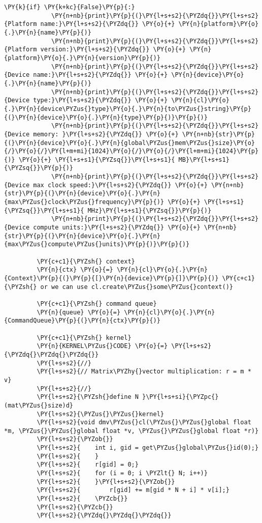 \begin{Verbatim}[commandchars=\\\{\}]
         \PY{k}{if} \PY{k+kc}{False}\PY{p}{:}
             \PY{n+nb}{print}\PY{p}{(}\PY{l+s+s2}{\PYZdq{}}\PY{l+s+s2}{Platform name:}\PY{l+s+s2}{\PYZdq{}} \PY{o}{+} \PY{n}{platform}\PY{o}{.}\PY{n}{name}\PY{p}{)}
             \PY{n+nb}{print}\PY{p}{(}\PY{l+s+s2}{\PYZdq{}}\PY{l+s+s2}{Platform version:}\PY{l+s+s2}{\PYZdq{}} \PY{o}{+} \PY{n}{platform}\PY{o}{.}\PY{n}{version}\PY{p}{)}
             \PY{n+nb}{print}\PY{p}{(}\PY{l+s+s2}{\PYZdq{}}\PY{l+s+s2}{Device name:}\PY{l+s+s2}{\PYZdq{}} \PY{o}{+} \PY{n}{device}\PY{o}{.}\PY{n}{name}\PY{p}{)}
             \PY{n+nb}{print}\PY{p}{(}\PY{l+s+s2}{\PYZdq{}}\PY{l+s+s2}{Device type:}\PY{l+s+s2}{\PYZdq{}} \PY{o}{+} \PY{n}{cl}\PY{o}{.}\PY{n}{device\PYZus{}type}\PY{o}{.}\PY{n}{to\PYZus{}string}\PY{p}{(}\PY{n}{device}\PY{o}{.}\PY{n}{type}\PY{p}{)}\PY{p}{)}
             \PY{n+nb}{print}\PY{p}{(}\PY{l+s+s2}{\PYZdq{}}\PY{l+s+s2}{Device memory: }\PY{l+s+s2}{\PYZdq{}} \PY{o}{+} \PY{n+nb}{str}\PY{p}{(}\PY{n}{device}\PY{o}{.}\PY{n}{global\PYZus{}mem\PYZus{}size}\PY{o}{/}\PY{o}{/}\PY{l+m+mi}{1024}\PY{o}{/}\PY{o}{/}\PY{l+m+mi}{1024}\PY{p}{)} \PY{o}{+} \PY{l+s+s1}{\PYZsq{}}\PY{l+s+s1}{ MB}\PY{l+s+s1}{\PYZsq{}}\PY{p}{)}
             \PY{n+nb}{print}\PY{p}{(}\PY{l+s+s2}{\PYZdq{}}\PY{l+s+s2}{Device max clock speed:}\PY{l+s+s2}{\PYZdq{}} \PY{o}{+} \PY{n+nb}{str}\PY{p}{(}\PY{n}{device}\PY{o}{.}\PY{n}{max\PYZus{}clock\PYZus{}frequency}\PY{p}{)} \PY{o}{+} \PY{l+s+s1}{\PYZsq{}}\PY{l+s+s1}{ MHz}\PY{l+s+s1}{\PYZsq{}}\PY{p}{)}
             \PY{n+nb}{print}\PY{p}{(}\PY{l+s+s2}{\PYZdq{}}\PY{l+s+s2}{Device compute units:}\PY{l+s+s2}{\PYZdq{}} \PY{o}{+} \PY{n+nb}{str}\PY{p}{(}\PY{n}{device}\PY{o}{.}\PY{n}{max\PYZus{}compute\PYZus{}units}\PY{p}{)}\PY{p}{)}
         
         \PY{c+c1}{\PYZsh{} context}
         \PY{n}{ctx} \PY{o}{=} \PY{n}{cl}\PY{o}{.}\PY{n}{Context}\PY{p}{(}\PY{p}{[}\PY{n}{device}\PY{p}{]}\PY{p}{)} \PY{c+c1}{\PYZsh{} or we can use cl.create\PYZus{}some\PYZus{}context()}
         
         \PY{c+c1}{\PYZsh{} command queue}
         \PY{n}{queue} \PY{o}{=} \PY{n}{cl}\PY{o}{.}\PY{n}{CommandQueue}\PY{p}{(}\PY{n}{ctx}\PY{p}{)}
         
         \PY{c+c1}{\PYZsh{} kernel}
         \PY{n}{KERNEL\PYZus{}CODE} \PY{o}{=} \PY{l+s+s2}{\PYZdq{}\PYZdq{}\PYZdq{}}
         \PY{l+s+s2}{//}
         \PY{l+s+s2}{// Matrix\PYZhy{}vector multiplication: r = m * v}
         \PY{l+s+s2}{//}
         \PY{l+s+s2}{\PYZsh{}define N }\PY{l+s+si}{\PYZpc{}(mat\PYZus{}size)d}
         \PY{l+s+s2}{\PYZus{}\PYZus{}kernel}
         \PY{l+s+s2}{void dmv\PYZus{}cl(\PYZus{}\PYZus{}global float *m, \PYZus{}\PYZus{}global float *v, \PYZus{}\PYZus{}global float *r)}
         \PY{l+s+s2}{\PYZob{}}
         \PY{l+s+s2}{    int i, gid = get\PYZus{}global\PYZus{}id(0);}
         \PY{l+s+s2}{    }
         \PY{l+s+s2}{    r[gid] = 0;}
         \PY{l+s+s2}{    for (i = 0; i \PYZlt{} N; i++)}
         \PY{l+s+s2}{    }\PY{l+s+s2}{\PYZob{}}
         \PY{l+s+s2}{        r[gid] += m[gid * N + i] * v[i];}
         \PY{l+s+s2}{    \PYZcb{}}
         \PY{l+s+s2}{\PYZcb{}}
         \PY{l+s+s2}{\PYZdq{}\PYZdq{}\PYZdq{}}
         

\end{Verbatim}
